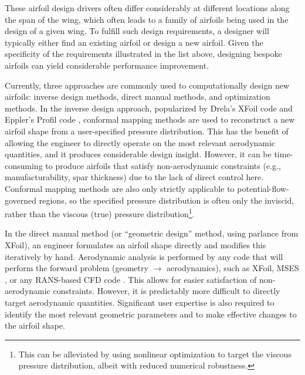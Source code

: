 These airfoil design drivers often differ considerably at different locations along the span of the wing, which often leads to a family of airfoils being used in the design of a given wing. To fulfill such design requirements, a designer will typically either find an existing airfoil or design a new airfoil. Given the specificity of the requirements illustrated in the list above, designing bespoke airfoils can yield considerable performance improvement.

Currently, three approaches are commonly used to computationally design new airfoils: inverse design methods, direct manual methods, and optimization methods. In the inverse design approach, popularized by Drela's XFoil code \cite{drela_xfoil_1989} and Eppler's Profil code \cite{profil, tao_bs_thesis}, conformal mapping methods are used to reconstruct a new airfoil shape from a user-specified pressure distribution. This has the benefit of allowing the engineer to directly operate on the most relevant aerodynamic quantities, and it produces considerable design insight. However, it can be time-consuming to produce airfoils that satisfy non-aerodynamic constraints (e.g., manufacturability, spar thickness) due to the lack of direct control here. Conformal mapping methods are also only strictly applicable to potential-flow-governed regions, so the specified pressure distribution is often only the inviscid, rather than the viscous (true) pressure distribution\footnote{This can be alleviated by using nonlinear optimization to target the viscous pressure distribution, albeit with reduced numerical robustness.}.

In the direct manual method (or ``geometric design'' method, using parlance from XFoil), an engineer formulates an airfoil shape directly and modifies this iteratively by hand. Aerodynamic analysis is performed by any code that will perform the forward problem (geometry $\rightarrow$ aerodynamics), such as XFoil, MSES \cite{mses}, or any RANS-based CFD code \cite{adler_cfd_2022}. This allows for easier satisfaction of non-aerodynamic constraints. However, it is predictably more difficult to directly target aerodynamic quantities. Significant user expertise is also required to identify the most relevant geometric parameters and to make effective changes to the airfoil shape.

